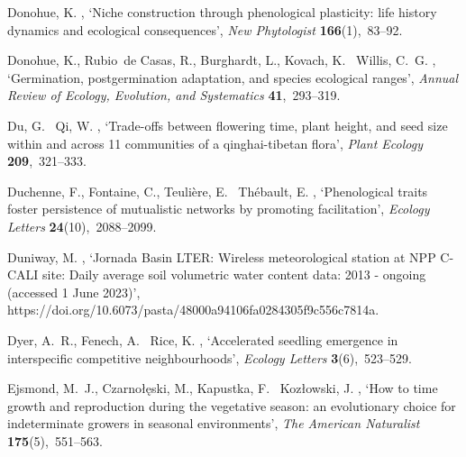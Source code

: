 \documentclass[11pt]{article}
\begin{document}
\begin{thebibliography}{xx}
Donohue, K.  \harvardyearright , `Niche construction
  through phenological plasticity: life history dynamics and ecological
  consequences', {\em New Phytologist} {\bf 166}(1),~83--92.

Donohue, K., Rubio~de Casas, R., Burghardt, L., Kovach, K. \harvardand\ Willis,
  C.~G.  \harvardyearright , `Germination, postgermination
  adaptation, and species ecological ranges', {\em Annual Review of Ecology,
  Evolution, and Systematics} {\bf 41},~293--319.

Du, G. \harvardand\ Qi, W.  \harvardyearright ,
  `Trade-offs between flowering time, plant height, and seed size within and
  across 11 communities of a qinghai-tibetan flora', {\em Plant Ecology} {\bf
  209},~321--333.

Duchenne, F., Fontaine, C., Teuli{\`e}re, E. \harvardand\ Th{\'e}bault, E.
  \harvardyearleft 2021\harvardyearright , `Phenological traits foster
  persistence of mutualistic networks by promoting facilitation', {\em Ecology
  Letters} {\bf 24}(10),~2088--2099.

Duniway, M.  \harvardyearright , `{Jornada Basin LTER:
  Wireless meteorological station at NPP C-CALI site: Daily average soil
  volumetric water content data: 2013 - ongoing (accessed 1 June 2023)}',
  https://doi.org/10.6073/pasta/48000a94106fa0284305f9c556c7814a.

Dyer, A.~R., Fenech, A. \harvardand\ Rice, K.  \harvardyearleft
  2000\harvardyearright , `Accelerated seedling emergence in interspecific
  competitive neighbourhoods', {\em Ecology Letters} {\bf 3}(6),~523--529.

Ejsmond, M.~J., Czarno{\l}{\k{e}}ski, M., Kapustka, F. \harvardand\
  Koz{\l}owski, J.  \harvardyearright , `How to time
  growth and reproduction during the vegetative season: an evolutionary choice
  for indeterminate growers in seasonal environments', {\em The American
  Naturalist} {\bf 175}(5),~551--563.


\end{thebibliography}
\end{document}
